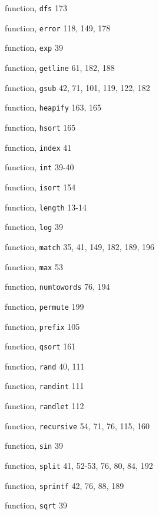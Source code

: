 \begin{multicols}{3}
\hangindent=3pc  function, \verb'dfs' 173

\hangindent=3pc  function, \verb'error' 118, 149, 178

\hangindent=3pc  function, \verb'exp' 39

\hangindent=3pc  function, \verb'getline' 61, 182, 188

\hangindent=3pc  function, \verb'gsub' 42, 71, 101, 119, 122, 182

\hangindent=3pc  function, \verb'heapify' 163, 165

\hangindent=3pc  function, \verb'hsort' 165

\hangindent=3pc  function, \verb'index' 41

\hangindent=3pc  function, \verb'int' 39-40

\hangindent=3pc  function, \verb'isort' 154

\hangindent=3pc  function, \verb'length' 13-14

\hangindent=3pc  function, \verb'log' 39

\hangindent=3pc  function, \verb'match' 35, 41, 149, 182, 189, 196

\hangindent=3pc  function, \verb'max' 53

\hangindent=3pc  function, \verb'numtowords' 76, 194

\hangindent=3pc  function, \verb'permute' 199

\hangindent=3pc  function, \verb'prefix' 105

\hangindent=3pc  function, \verb'qsort' 161

\hangindent=3pc  function, \verb'rand' 40, 111

\hangindent=3pc  function, \verb'randint' 111

\hangindent=3pc  function, \verb'randlet' 112

\hangindent=3pc  function, \verb'recursive' 54, 71, 76, 115, 160

\hangindent=3pc  function, \verb'sin' 39

\hangindent=3pc  function, \verb'split' 41, 52-53, 76, 80, 84, 192

\hangindent=3pc  function, \verb'sprintf' 42, 76, 88, 189

\hangindent=3pc  function, \verb'sqrt' 39


\end{multicols}
